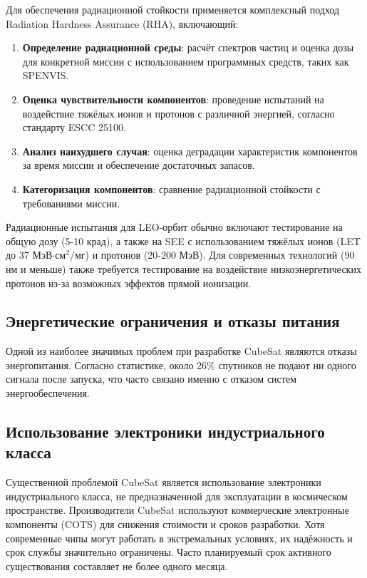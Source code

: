 Для обеспечения радиационной стойкости применяется комплексный подход Radiation Hardness Assurance (RHA), включающий:

\begin{enumerate}
    \item \textbf{Определение радиационной среды}: расчёт спектров частиц и оценка дозы для конкретной миссии с использованием программных средств, таких как SPENVIS\cite{nasa_rha_standard}.
    
    \item \textbf{Оценка чувствительности компонентов}: проведение испытаний на воздействие тяжёлых ионов и протонов с различной энергией, согласно стандарту ESCC 25100\cite{escc_see_test}.
    
    \item \textbf{Анализ наихудшего случая}: оценка деградации характеристик компонентов за время миссии и обеспечение достаточных запасов\cite{nasa_rha_standard}.
    
    \item \textbf{Категоризация компонентов}: сравнение радиационной стойкости с требованиями миссии\cite{rha_space_systems}.
\end{enumerate}

Радиационные испытания для LEO-орбит обычно включают тестирование на общую дозу (5-10 крад), а также на SEE с использованием тяжёлых ионов (LET до 37 МэВ$\cdot$см$^2$/мг) и протонов (20-200 МэВ)\cite{proton_guide}. Для современных технологий (90 нм и меньше) также требуется тестирование на воздействие низкоэнергетических протонов из-за возможных эффектов прямой ионизации\cite{escc_see_test}.



\subsection{Энергетические ограничения и отказы питания}
Одной из наиболее значимых проблем при разработке CubeSat являются отказы энергопитания. Согласно статистике, около 26\% спутников не подают ни одного сигнала после запуска, что часто связано именно с отказом систем энергообеспечения\cite{kulu2020nanosats}.

\subsection{Использование электроники индустриального класса}
Существенной проблемой CubeSat является использование электроники индустриального класса, не предназначенной для эксплуатации в космическом пространстве\cite{scholz2015cots}. Производители CubeSat используют коммерческие электронные компоненты (COTS) для снижения стоимости и сроков разработки. Хотя современные чипы могут работать в экстремальных условиях, их надёжность и срок службы значительно ограничены. Часто планируемый срок активного существования составляет не более одного месяца\cite{scholz2015cots}.

